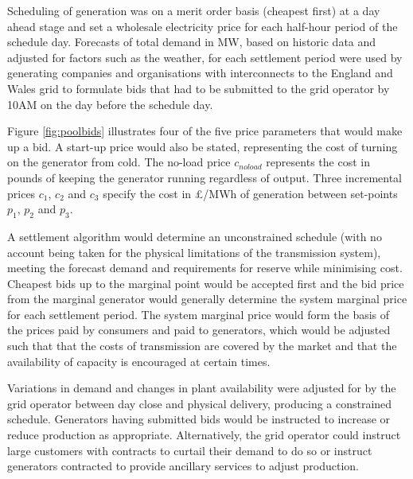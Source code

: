 Scheduling of generation was on a merit order basis (cheapest first) at a day
ahead stage and set a wholesale electricity price for each half-hour period of
the schedule day.  Forecasts of total demand in MW, based on historic data and
adjusted for factors such as the weather, for each settlement period were used
by generating companies and organisations with interconnects to the England
and Wales grid to formulate bids that had to be submitted to the grid operator
by 10AM on the day before the schedule day.


Figure \ref{fig:poolbids} illustrates four of the five price parameters
that would make up a bid.  A start-up price would also be stated, representing
the cost of turning on the generator from cold.  The no-load price $c_{noload}$
represents the cost in pounds of keeping the generator running regardless of output. Three
incremental prices $c_1$, $c_2$ and $c_3$ specify the cost in \pounds/MWh of
generation between set-points $p_1$, $p_2$ and $p_3$.

A settlement algorithm would determine an unconstrained schedule
(with no account being taken for the physical limitations of the transmission
system), meeting the forecast demand and requirements for reserve while minimising cost.
Cheapest bids up to the marginal point would be accepted first and the bid
price from the marginal generator would generally determine the system marginal
price for each settlement period.  The system marginal price would form the
basis of the prices paid by consumers and paid to generators, which would be
adjusted such that that the costs of transmission are covered by the market and that the
availability of capacity is encouraged at certain times.

Variations in demand and changes in plant availability were adjusted for by
the grid operator between day close and physical delivery, producing a
constrained schedule. Generators having submitted bids would be instructed to
increase or reduce production as appropriate.  Alternatively, the grid operator
could instruct large customers with contracts to curtail their demand to do so
or instruct generators contracted to provide ancillary services to adjust
production.

